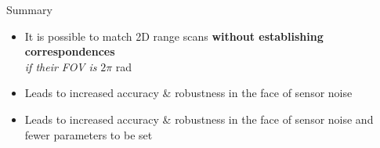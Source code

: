 \begin{frame}[noframenumbering]{Summary}

\begin{overlayarea}{\textwidth}{3cm}
\leavevmode
  \begin{itemize}
    \item It is possible to match 2D range scans \textbf{without establishing correspondences}\\
          \textit{if their FOV is} $2\pi$ rad
    \item<2|only@2> Leads to increased accuracy \& robustness in the face of sensor noise
    \item<3|only@3> Leads to increased accuracy \& robustness in the face of sensor noise and fewer parameters to be set
  \end{itemize}

\end{overlayarea}
\end{frame}

